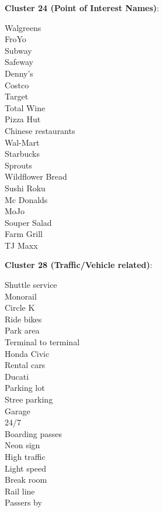 \documentclass[11pt]{article}
\begin{document}
\textbf{Cluster 24 (Point of Interest Names)}:
\begin{multicols}{3}
Walgreens\\
FroYo\\
Subway\\
Safeway\\
Denny's\\
Costco\\
Target\\
Total Wine\\
Pizza Hut\\
Chinese restaurants\\
Wal-Mart\\
Starbucks\\
Sprouts\\
Wildflower Bread\\
Sushi Roku\\
Mc Donalds\\
MoJo\\
Souper Salad\\
Farm Grill\\
TJ Maxx
\end{multicols}

\textbf{Cluster 28 (Traffic/Vehicle related)}:
\begin{multicols}{3}
Shuttle service\\
Monorail\\
Circle K\\
Ride bikes\\
Park area\\
Terminal to terminal\\
Honda Civic\\
Rental cars\\
Ducati\\
Parking lot\\
Stree parking\\
Garage\\
24/7\\
Boarding passes\\
Neon sign\\
High traffic\\
Light speed\\
Break room\\
Rail line\\
Passers by
\end{multicols}
\end{document}
